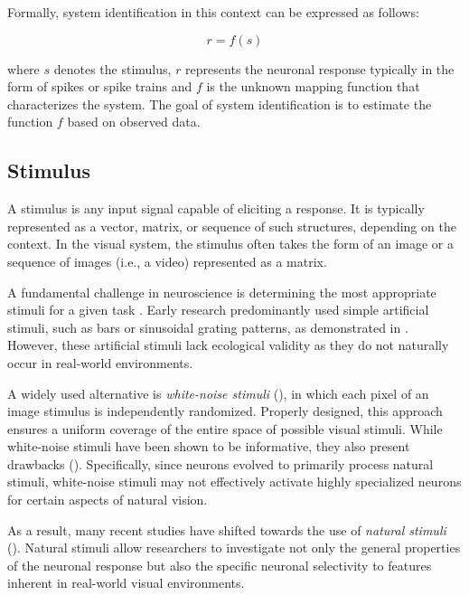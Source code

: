 Formally, system identification in this context can be expressed as follows:

\begin{equation}
    r = f(s)
\end{equation}
\label{eq:system_identification}

where $s$ denotes the stimulus, $r$ represents the neuronal response typically in the form of spikes or spike trains and $f$ is the unknown mapping function that characterizes the system. The goal of system identification is to estimate the function $f$ based on observed data.

\subsection{Stimulus}
\label{subsec:stimulus}

A stimulus is any input signal capable of eliciting a response. It is typically represented as a vector, matrix, or sequence of such structures, depending on the context. In the visual system, the stimulus often takes the form of an image or a sequence of images (i.e., a video) represented as a matrix.

A fundamental challenge in neuroscience is determining the most appropriate stimuli for a given task \citep{Carandini10577}. Early research predominantly used simple artificial stimuli, such as bars or sinusoidal grating patterns, as demonstrated in \citet{hubel1965receptive}. However, these artificial stimuli lack ecological validity as they do not naturally occur in real-world environments.

A widely used alternative is \emph{white-noise stimuli} (\citet{dayan2005theoretical, chichilnisky2001simple}), in which each pixel of an image stimulus is independently randomized. Properly designed, this approach ensures a uniform coverage of the entire space of possible visual stimuli. While white-noise stimuli have been shown to be informative, they also present drawbacks (\citet{Talebi1560}). Specifically, since neurons evolved to primarily process natural stimuli, white-noise stimuli may not effectively activate highly specialized neurons for certain aspects of natural vision.

As a result, many recent studies have shifted towards the use of \emph{natural stimuli} (\citet{sonkusare2019naturalistic, lurz2020generalization, antolik2024comprehensive}). Natural stimuli allow researchers to investigate not only the general properties of the neuronal response but also the specific neuronal selectivity to features inherent in real-world visual environments.

